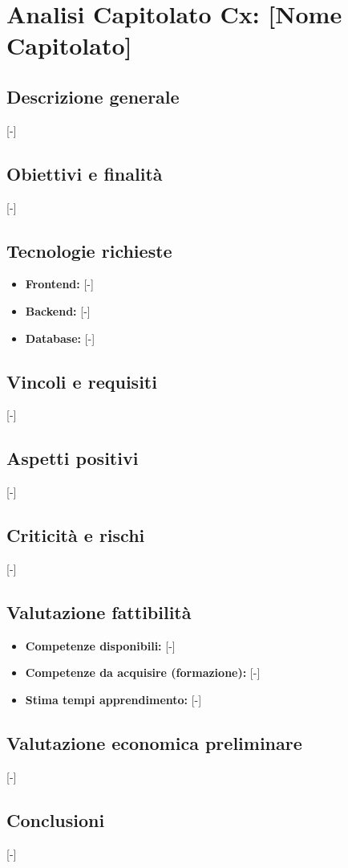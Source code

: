 \section{Analisi Capitolato Cx: {[Nome Capitolato]}}

\subsection{Descrizione generale}
{[-]}

\subsection{Obiettivi e finalità}
{[-]}

\subsection{Tecnologie richieste}
\begin{itemize}
	\item \textbf{Frontend:} {[-]}
	\item \textbf{Backend:} {[-]}
	\item \textbf{Database:} {[-]}
\end{itemize}

\subsection{Vincoli e requisiti}
{[-]}

\subsection{Aspetti positivi}
{[-]}

\subsection{Criticità e rischi}
{[-]}

\subsection{Valutazione fattibilità}
\begin{itemize}
	\item \textbf{Competenze disponibili:} {[-]}
	\item \textbf{Competenze da acquisire (formazione):} {[-]}
	\item \textbf{Stima tempi apprendimento:} {[-]}
\end{itemize}

\subsection{Valutazione economica preliminare}
{[-]}

\subsection{Conclusioni}
{[-]}
